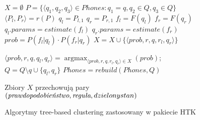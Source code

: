 \documentclass[shortabstract, mgr]{iithesis}
\DeclareMathOperator*{\argmax}{\arg\max}   %
\begin{document}
	\begin{figure}
		\begin{algorithmic}[1]
			
			
				\STATE $X = \emptyset \label{line:iter_begin}$
					\STATE $P = \Big\{\langle q_1, q_2, q_3\rangle \in Phones: q_1 = q, q_2 \in Q, q_3 \in Q\Big\}$
						\STATE $\langle P_l, P_r \rangle = r(P)$			
						\STATE $q_l = P_{l,1}$
						\STATE $q_r = P_{r,1}$
						\STATE $f_l = F(q_l)$ \label{line:f_l}
						\STATE $f_r = F(q_r)$ \label{line:f_r}
							\STATE $q_l.params = estimate(f_l)$
							\STATE $q_r.params = estimate(f_r)$
								\STATE $prob = P(f_l | q_l) \cdot P(f_r | q_r)$
								\STATE $X = X \cup \{\langle prob, r, q, r_l, q_r\rangle\}$ \label{line:r_prob}
							\ENDIF
						\ENDIF
					\ENDFOR
				\ENDFOR \label{line:iter_end}
				
					
					\STATE $\langle prob, r, q, q_l, q_r\rangle = \argmax_{\langle prob, r, q, r_l, q_r\rangle\in X}(prob)$;
					\STATE $Q = Q \setminus {q} \cup \{q_l, q_r\} \label{line:q_ext}$
					\STATE $Phones = rebuild(Phones, Q)\label{line:p_eqt}$
				\ELSE
				\ENDIF
			\ENDWHILE
		\end{algorithmic}
		
		Zbiory $X$ przechowują pary $(\textit{\text{prawdopodobieństwo}}, \textit{\text{reguła}}, dzielony stan)$ 
		
		\caption{Algorytmy tree-based clustering zastosowany w pakiecie HTK}
		\label{alg:tree_based_clustering}
	\end{figure}
\end{document}
